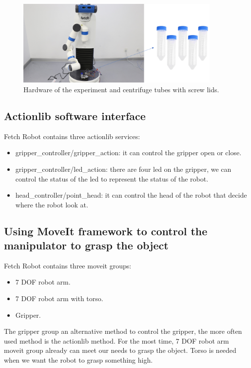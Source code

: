 \documentclass[12pt,draftclsnofoot,onecolumn]{IEEEtran}
\begin{document}
	\begin{figure}[htbp] %
		\centering
		\includegraphics[width=0.9\textwidth]{img/fetch.png}
		\caption{
			Hardware of the experiment and centrifuge tubes with screw lids.
		}
		\label{tube}
	\end{figure}
	
	
	
	
	\subsection{Actionlib software interface}
	Fetch Robot contains three actionlib services:
	\begin{itemize}
	\item \/gripper\_controller/gripper\_action: it can control the gripper open or close.
	\item \/gripper\_controller/led\_action: there are four led on the gripper, we can control the status of the led to represent the status of the robot.
	\item \/head\_controller/point\_head: it can control the head of the robot that decide where the robot look at.
	\end{itemize}
	
	
	\subsection{Using MoveIt framework to control the manipulator to grasp the object}
	Fetch Robot contains three moveit groups:  
	\begin{itemize}
	\item 7 DOF robot arm.
	\item 7 DOF robot arm with torso.
	\item Gripper.
	\end{itemize}
	
	The gripper group an alternative method to control the gripper, the more often used method is the actionlib method.
	For the most time, 7 DOF robot arm moveit group already can meet our needs to grasp the object. Torso is needed when we want the robot to grasp something high.
	
\end{document}
